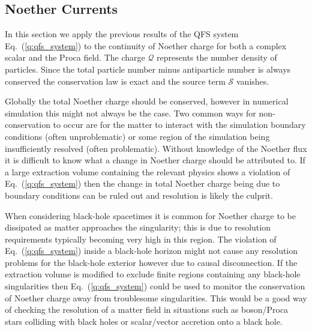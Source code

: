 \subsection{Noether Currents} \label{q:sect:noether}

In this section we apply the previous results of the QFS system Eq.~(\ref{q:qfs_system})
to the continuity of Noether charge for both a complex scalar and the Proca field. The charge $\mathcal{Q}$ represents the number density of particles. Since the total particle number minus antiparticle number is always conserved the conservation law is exact and the source term $\mathcal{S}$ vanishes.

Globally the total Noether charge should be conserved, however in numerical simulation this might not always be the case. Two common ways for non-conservation to occur are for the matter to interact with the simulation boundary conditions (often unproblematic) or some region of the simulation being insufficiently resolved (often problematic). Without knowledge of the Noether flux it is difficult to know what a change in Noether charge should be attributed to. If a large extraction volume containing the relevant physics shows a violation of Eq.~(\ref{q:qfs_system}) then the change in total Noether charge being due to boundary conditions can be ruled out and resolution is likely the culprit.

When considering black-hole spacetimes it is common for Noether charge to be dissipated as matter approaches the singularity; this is due to resolution requirements typically becoming very high in this region. The violation of Eq.~(\ref{q:qfs_system}) inside a black-hole horizon might not cause any resolution problems for the black-hole exterior however due to causal disconnection. If the extraction volume is modified to exclude finite regions containing any black-hole singularities then Eq.~(\ref{q:qfs_system}) could be used to monitor the conservation of Noether charge away from troublesome singularities. This would be a good way of checking the resolution of a matter field in situations such as boson/Proca stars colliding with black holes or scalar/vector accretion onto a black hole.




